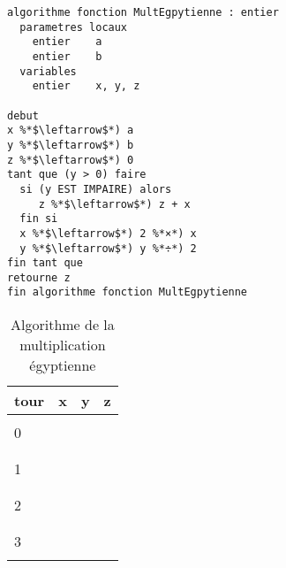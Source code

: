 \documentclass[11pt,a4paper]{article}
\begin{document}
\begin{table}[h!]
  \centering
  \begin{minipage}{0.59\textwidth}
    \centering
\begin{lstlisting}[style=algorithm]
algorithme fonction MultEgpytienne : entier
  parametres locaux
    entier    a
    entier    b
  variables
    entier    x, y, z

debut
x %*$\leftarrow$*) a
y %*$\leftarrow$*) b
z %*$\leftarrow$*) 0
tant que (y > 0) faire
  si (y EST IMPAIRE) alors
     z %*$\leftarrow$*) z + x
  fin si
  x %*$\leftarrow$*) 2 %*×*) x
  y %*$\leftarrow$*) y %*÷*) 2
fin tant que
retourne z
fin algorithme fonction MultEgpytienne \end{lstlisting}
  \end{minipage}
  \hfillx
  \begin{minipage}{0.4\textwidth}
    \centering
    \begin{tabular}{|C{1cm}|C{1cm}|C{1cm}|C{1cm}|}
        \hline
        tour &  x &  y &  z  \\
        \hline
             &    &    &   \\
        0    &    &    &     \\
             &    &    &   \\
        \hline
             &    &    &   \\
        1    &    &    &     \\
             &    &    &   \\
        \hline
             &    &    &   \\
        2    &    &    &     \\
             &    &    &   \\
        \hline
             &    &    &   \\
        3    &    &    &     \\
             &    &    &   \\
        \hline
    \end{tabular}
  \end{minipage}
  \caption{Algorithme de la multiplication égyptienne}
  \label{multiplication-egyptienne}
\end{table}
\end{document}
